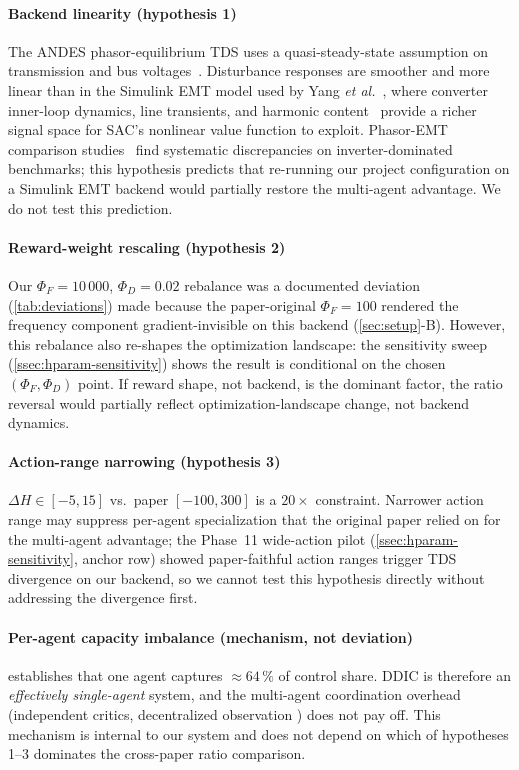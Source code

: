 \documentclass[journal,onecolumn,11pt]{IEEEtran}
\begin{document}
\paragraph{Backend linearity (hypothesis 1)}
The ANDES phasor-equilibrium TDS uses a quasi-steady-state assumption
on transmission and bus voltages~\cite{cui2021andes,milano2020frequency}.
Disturbance responses are smoother and more linear than in the
Simulink EMT model used by Yang \emph{et al.}~\cite{yang2023ddic},
where converter inner-loop dynamics, line transients, and harmonic
content~\cite{stiasny2023phasor,markovic2021lowinertia} provide a
richer signal space for SAC's nonlinear value function to exploit.
Phasor-EMT comparison studies~\cite{stiasny2023phasor} find systematic
discrepancies on inverter-dominated benchmarks; this hypothesis
predicts that re-running our project configuration on a Simulink EMT
backend would partially restore the multi-agent advantage. We do not
test this prediction.

\paragraph{Reward-weight rescaling (hypothesis 2)}
Our $\Phi_F = 10\,000$, $\Phi_D = 0.02$ rebalance was a documented
deviation (\cref{tab:deviations}) made because the paper-original
$\Phi_F = 100$ rendered the frequency component gradient-invisible
on this backend (\cref{sec:setup}-B). However, this rebalance also
re-shapes the optimization landscape: the sensitivity sweep
(\cref{ssec:hparam-sensitivity}) shows the result is conditional on
the chosen $(\Phi_F,\Phi_D)$ point. If reward shape, not backend, is
the dominant factor, the ratio reversal would partially reflect
optimization-landscape change, not backend dynamics.

\paragraph{Action-range narrowing (hypothesis 3)}
$\Delta H \in [-5, 15]$ vs.\ paper $[-100, 300]$ is a $20\times$
constraint. Narrower action range may suppress per-agent specialization
that the original paper relied on for the multi-agent advantage; the
Phase~11 wide-action pilot (\cref{ssec:hparam-sensitivity}, anchor row)
showed paper-faithful action ranges trigger TDS divergence on our
backend, so we cannot test this hypothesis directly without addressing
the divergence first.

\paragraph{Per-agent capacity imbalance (mechanism, not deviation)}
 establishes that one agent captures
$\approx 64\,\%$ of control share. DDIC is therefore an
\emph{effectively single-agent} system, and the multi-agent
coordination overhead (independent critics, decentralized observation
\cite{glavic2017rl,hadidi2013ml}) does not pay off. This mechanism
is internal to our system and does not depend on which of hypotheses
1--3 dominates the cross-paper ratio comparison.
\end{document}
